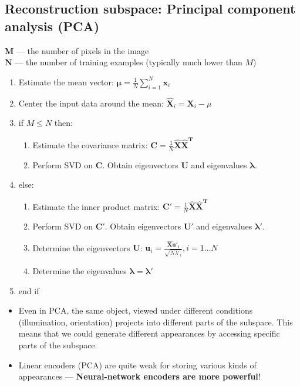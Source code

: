 \documentclass{article}
\begin{document}
    \subsection{Reconstruction subspace: Principal component analysis (PCA)}
    $\mathbf{M}$ --- the number of pixels in the image \\
    $\mathbf{N}$ --- the number of training examples (typically much lower than $M$) 
        
    \begin{enumerate}
        \item Estimate the mean vector: $\mathbf{\mu} = \frac{1}{N} \sum_{i=1}^N \mathbf{x}_i$ 
        \item Center the input data around the mean: $\mathbf{\hat{X}}_i = \mathbf{X}_i - \mu$
        \item if $M \leq N$ then:
        \begin{enumerate}
            \item Estimate the covariance matrix: $\mathbf{C} = \frac{1}{N} \mathbf{\hat{X}\hat{X}^T}$
            \item Perform SVD on $\mathbf{C}$. Obtain eigenvectors $\mathbf{U}$ and eigenvalues $\mathbf{\lambda}$.
        \end{enumerate}
        \item else:
        \begin{enumerate}
            \item Estimate the inner product matrix: $\mathbf{C'} = \frac{1}{N} \mathbf{\hat{X}\hat{X}^T}$
            \item Perform SVD on $\mathbf{C'}$. Obtain eigenvectors $\mathbf{U'}$ and eigenvalues $\mathbf{\lambda'}$.
            \item Determine the eigenvectors $\mathbf{U}$: $\mathbf{u}_i = \frac{\mathbf{\hat{X}u'_i}}{\sqrt{N\lambda'_i}}, i = 1 \ldots N$
            \item Determine the eigenvalues $\mathbf{\lambda} = \mathbf{\lambda'}$
        \end{enumerate}
        \item end if
    \end{enumerate}

    \begin{itemize}
        \item Even in PCA, the same object, viewed under different conditions (illumination, orientation) projects into different parts of the subspace. This means that we could generate different appearances by accessing specific parts of the subspace.
        \item Linear encoders (PCA) are quite weak for storing  various kinds of appearances --- \textbf{Neural-network encoders are more powerful}!
    \end{itemize}
\end{document}
